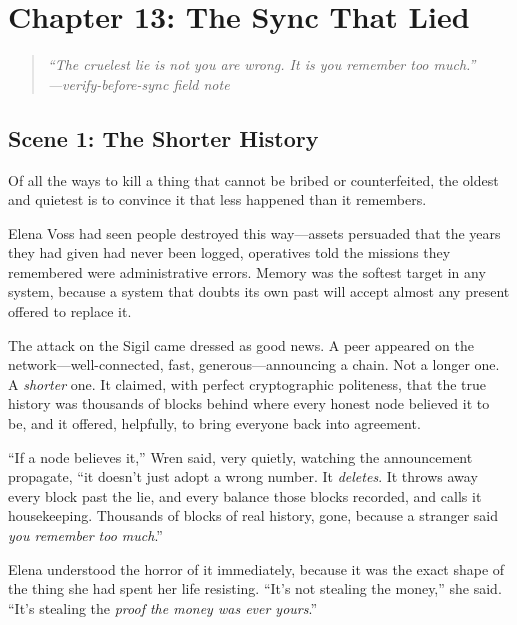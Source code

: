 \hypertarget{chapter-13-the-sync-that-lied}{%
\section{Chapter 13: The Sync That
Lied}\label{chapter-13-the-sync-that-lied}}

\begin{quote}
\itshape ``The cruelest lie is not \emph{you are wrong}. It is \emph{you remember
too much}.''\\
\normalfont\hfill---verify-before-sync field note
\end{quote}

\hypertarget{scene-1-the-shorter-history}{%
\subsection{Scene 1: The Shorter
History}\label{scene-1-the-shorter-history}}

Of all the ways to kill a thing that cannot be bribed or counterfeited, the
oldest and quietest is to convince it that less happened than it remembers.

Elena Voss had seen people destroyed this way---assets persuaded that the years
they had given had never been logged, operatives told the missions they
remembered were administrative errors. Memory was the softest target in any
system, because a system that doubts its own past will accept almost any present
offered to replace it.

The attack on the Sigil came dressed as good news. A peer appeared on the
network---well-connected, fast, generous---announcing a chain. Not a longer one.
A \emph{shorter} one. It claimed, with perfect cryptographic politeness, that the
true history was thousands of blocks behind where every honest node believed it to
be, and it offered, helpfully, to bring everyone back into agreement.

``If a node believes it,'' Wren said, very quietly, watching the announcement
propagate, ``it doesn't just adopt a wrong number. It \emph{deletes}. It throws
away every block past the lie, and every balance those blocks recorded, and calls
it housekeeping. Thousands of blocks of real history, gone, because a stranger
said \emph{you remember too much}.''

Elena understood the horror of it immediately, because it was the exact shape of
the thing she had spent her life resisting. ``It's not stealing the money,'' she
said. ``It's stealing the \emph{proof the money was ever yours}.''

